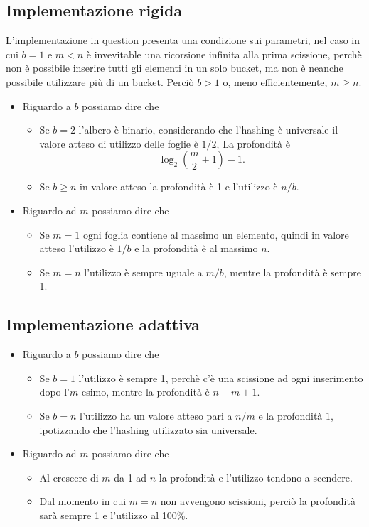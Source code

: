 \documentclass[a4paper]{article}
\begin{document}

\subsection{Implementazione rigida}

L'implementazione in question presenta una condizione sui parametri, nel caso in cui $b = 1$ e $m < n$ è invevitable una ricorsione infinita alla prima scissione, perchè non è possibile inserire tutti gli elementi in un solo bucket, ma non è neanche possibile utilizzare più di un bucket. Perciò $b > 1$ o, meno efficientemente, $m \geq n$.

\begin{itemize}
	\item Riguardo a $b$ possiamo dire che
	\begin{itemize}
		\item Se $b = 2$ l'albero è binario, considerando che l'hashing è universale il valore atteso di utilizzo delle foglie è $1/2$, La profondità è
			$$ \log_2 \left( \frac{m}{2} + 1 \right) - 1. $$
		\item Se $b \geq n$ in valore atteso la profondità è 1 e l'utilizzo è $n / b$.
	\end{itemize}
	\item Riguardo ad $m$ possiamo dire che
	\begin{itemize}
		\item Se $m = 1$ ogni foglia contiene al massimo un elemento, quindi in valore atteso l'utilizzo è $1 / b$ e la profondità è al massimo $n$.
		\item Se $m = n$ l'utilizzo è sempre uguale a $m / b$, mentre la profondità è sempre 1.
	\end{itemize}
\end{itemize}

\subsection{Implementazione adattiva}

\begin{itemize}
	\item Riguardo a $b$ possiamo dire che
	\begin{itemize}
		\item Se $b = 1$ l'utilizzo è sempre 1, perchè c'è una scissione ad ogni inserimento dopo l'$m$-esimo, mentre la profondità è $n - m + 1$.
		\item Se $b = n$ l'utilizzo ha un valore atteso pari a $n/m$ e la profondità $1$, ipotizzando che l'hashing utilizzato sia universale.
	\end{itemize}
	\item Riguardo ad $m$ possiamo dire che
	\begin{itemize}
		\item Al crescere di $m$ da 1 ad $n$ la profondità e l'utilizzo tendono a scendere. 
		\item Dal momento in cui $m = n$ non avvengono scissioni, perciò la profondità sarà sempre 1 e l'utilizzo al 100\%.
	\end{itemize}
\end{itemize}
\end{document}
